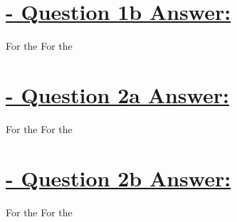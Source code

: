 \documentclass{article}
\begin{document}
\section{\underline{ - Question 1b Answer:}}
For the 
\newline
\newline
For the 
\newline

\section{\underline{ - Question 2a Answer:}}
For the 
\newline
\newline
For the 
\newline

\section{\underline{ - Question 2b Answer:}}
For the 
\newline
\newline
For the 
\newline
\end{document}
